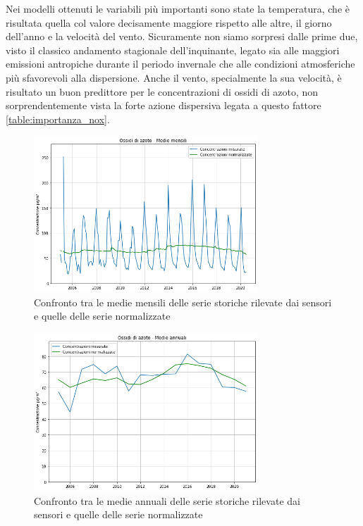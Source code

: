 \documentclass[a4paper]{report}
\begin{document}
Nei modelli ottenuti le variabili più importanti sono state la temperatura, che è risultata quella col valore decisamente maggiore rispetto alle altre, il giorno dell'anno e la velocità del vento. Sicuramente non siamo sorpresi dalle prime due, visto il classico andamento stagionale dell'inquinante, legato sia alle maggiori emissioni antropiche durante il periodo invernale che alle condizioni atmosferiche più sfavorevoli alla dispersione. Anche il vento, specialmente la sua velocità, è risultato un buon predittore per le concentrazioni di ossidi di azoto, non sorprendentemente vista la forte azione dispersiva legata a questo fattore \ref{table:importanza_nox}.

\begin{figure}[h]
\centering
\includegraphics[width=0.75\textwidth]{nox_medie_mensili}
\caption{Confronto tra le medie mensili delle serie storiche rilevate dai sensori e quelle delle serie normalizzate}
\label{fig:nox_medie_mensili}
\end{figure}

\begin{figure}[h]
\centering
\includegraphics[width=0.75\textwidth]{nox_medie_annuali}
\caption{Confronto tra le medie annuali delle serie storiche rilevate dai sensori e quelle delle serie normalizzate}
\label{fig:nox_medie_annuali}
\end{figure}
\end{document}
